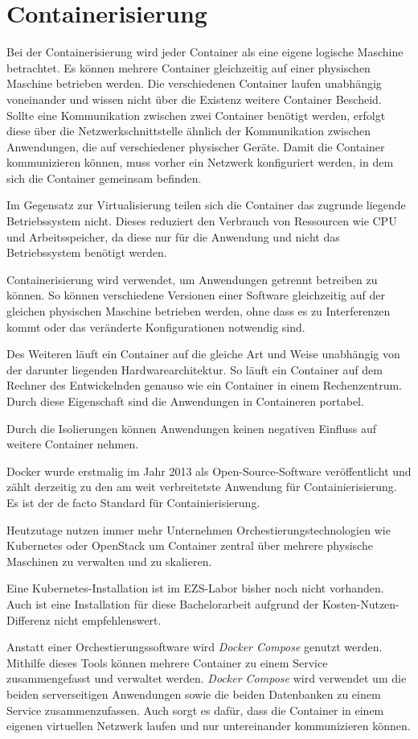 \section{Containerisierung} \label{sec:Containerisierung}
Bei der Containerisierung wird jeder Container als eine eigene logische Maschine betrachtet. Es können mehrere Container gleichzeitig auf einer physischen Maschine betrieben werden. 
Die verschiedenen Container laufen unabhängig voneinander und wissen nicht über die Existenz weitere Container Bescheid. Sollte eine Kommunikation zwischen zwei Container benötigt werden, erfolgt diese über die Netzwerkschnittstelle ähnlich der Kommunikation zwischen Anwendungen, die auf verschiedener physischer Geräte. Damit die Container kommunizieren können, muss vorher ein Netzwerk konfiguriert werden, in dem sich die Container gemeinsam befinden.

Im Gegensatz zur Virtualisierung teilen sich die Container das zugrunde liegende Betriebssystem nicht. Dieses reduziert den Verbrauch von Ressourcen wie CPU und Arbeitsspeicher, da diese nur für die Anwendung und nicht das Betriebssystem benötigt werden.

Containerisierung wird verwendet, um Anwendungen getrennt betreiben zu können. So können verschiedene Versionen einer Software gleichzeitig auf der gleichen physischen Maschine betrieben werden, ohne dass es zu Interferenzen kommt oder das veränderte Konfigurationen notwendig sind.

Des Weiteren läuft ein Container auf die gleiche Art und Weise unabhängig von der darunter liegenden Hardwarearchitektur. So läuft ein Container auf dem Rechner des Entwickelnden genauso wie ein Container in einem Rechenzentrum. Durch diese Eigenschaft sind die Anwendungen in Containeren portabel.

Durch die Isolierungen können Anwendungen keinen negativen Einfluss auf weitere Container nehmen.

Docker wurde erstmalig im Jahr 2013 als Open-Source-Software veröffentlicht und zählt derzeitig zu den am weit verbreitetste Anwendung für Containierisierung. Es ist der de facto Standard für Containierisierung. 
\cite{boersmaContainerizationDefinitionBest2019}

Heutzutage nutzen immer mehr Unternehmen Orchestierungstechnologien wie Kubernetes oder OpenStack um Container zentral über mehrere physische Maschinen zu verwalten und zu skalieren.
\cite{gaviganHistoryAngular2018}

Eine Kubernetes-Installation ist im EZS-Labor bisher noch nicht vorhanden. Auch ist eine Installation für diese Bachelorarbeit aufgrund der Kosten-Nutzen-Differenz nicht empfehlenswert.

Anstatt einer Orchestierungssoftware wird \textit{Docker Compose} genutzt werden.
Mithilfe dieses Tools können mehrere Container zu einem Service zusammengefasst und verwaltet werden. \textit{Docker Compose} wird verwendet um die beiden serverseitigen Anwendungen sowie die beiden Datenbanken zu einem Service zusammenzufassen. Auch sorgt es dafür, dass die Container in einem eigenen virtuellen Netzwerk laufen und nur untereinander kommunizieren können. \cite{dockerinc.OverviewDockerCompose2020} 